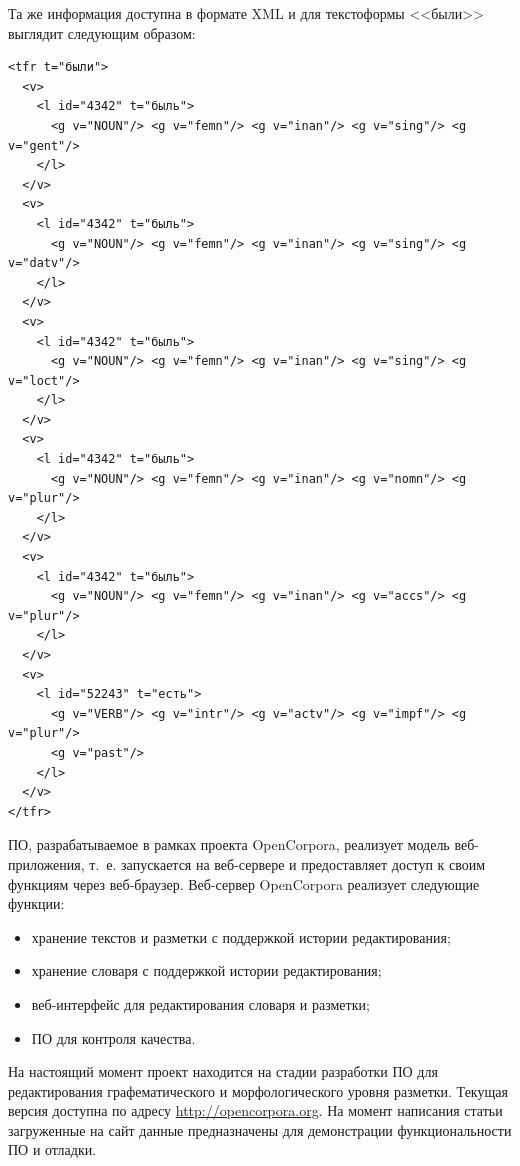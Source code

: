 \documentclass[a4paper]{article}
\begin{document}
Та же информация доступна в формате XML и для текстоформы <<были>> выглядит следующим образом:
\begin{verbatim}
<tfr t="были">
  <v>
    <l id="4342" t="быль">
      <g v="NOUN"/> <g v="femn"/> <g v="inan"/> <g v="sing"/> <g v="gent"/>
    </l>
  </v>
  <v>
    <l id="4342" t="быль">
      <g v="NOUN"/> <g v="femn"/> <g v="inan"/> <g v="sing"/> <g v="datv"/>
    </l>
  </v>
  <v>
    <l id="4342" t="быль">
      <g v="NOUN"/> <g v="femn"/> <g v="inan"/> <g v="sing"/> <g v="loct"/>
    </l>
  </v>
  <v>
    <l id="4342" t="быль">
      <g v="NOUN"/> <g v="femn"/> <g v="inan"/> <g v="nomn"/> <g v="plur"/>
    </l>
  </v>
  <v>
    <l id="4342" t="быль">
      <g v="NOUN"/> <g v="femn"/> <g v="inan"/> <g v="accs"/> <g v="plur"/>
    </l>
  </v>
  <v>
    <l id="52243" t="есть">
      <g v="VERB"/> <g v="intr"/> <g v="actv"/> <g v="impf"/> <g v="plur"/>
      <g v="past"/>
    </l>
  </v>
</tfr>
\end{verbatim}
ПО, разрабатываемое в рамках проекта OpenCorpora, реализует модель веб-приложения, т.~е. запускается на веб-сервере и предоставляет доступ к своим функциям через веб-браузер. Веб-сервер OpenCorpora реализует следующие функции:
\begin{itemize}
\item хранение текстов и разметки с поддержкой истории редактирования;
\item хранение словаря с поддержкой истории редактирования;
\item веб-интерфейс для редактирования словаря и разметки;
\item ПО для контроля качества.
\end{itemize}

На настоящий момент проект находится на стадии разработки ПО для редактирования графематического и морфологического уровня разметки. Текущая версия доступна по адресу \url{http://opencorpora.org}. На момент написания статьи загруженные на сайт данные предназначены для демонстрации функциональности ПО и отладки.
\end{document}
